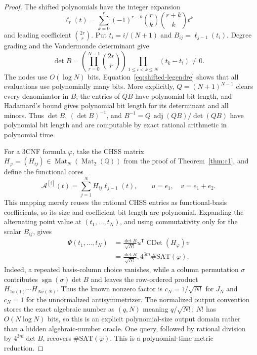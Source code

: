 \documentclass[11pt]{article}
\theoremstyle{definition}
\newcommand{\Mat}{\operatorname{Mat}}
\newcommand{\CDet}{\operatorname{CDet}}
\begin{document}
\begin{proof}
The shifted polynomials have the integer expansion
\begin{equation}
 \ell_r(t)=\sum_{k=0}^r(-1)^{r-k}
 \binom rk\binom{r+k}{k}t^k
 \label{eq:shifted-legendre}
\end{equation}
and leading coefficient $\binom{2r}{r}$.  Put $t_i=i/(N+1)$ and
$B_{ij}=\ell_{j-1}(t_i)$.  Degree grading and the Vandermonde determinant give
\begin{equation}
 \det B=\left(\prod_{r=0}^{N-1}\binom{2r}{r}\right)
 \prod_{1\le i<k\le N}(t_k-t_i)\ne0.
 \label{eq:legendre-determinant}
\end{equation}
The nodes use $O(\log N)$ bits.  Equation~\eqref{eq:shifted-legendre} shows
that all evaluations use polynomially many bits.  More explicitly,
$Q=(N+1)^{N-1}$ clears every denominator in $B$; the entries of $QB$ have
polynomial bit length, and Hadamard's bound gives polynomial bit length for
its determinant and all minors.  Thus $\det B$, $(\det B)^{-1}$, and
$B^{-1}=Q\,\operatorname{adj}(QB)/\det(QB)$ have polynomial bit length and
are computable by exact rational arithmetic in polynomial time.

For a 3CNF formula $\varphi$, take the CHSS matrix
$H_\varphi=(H_{ij})\in\Mat_N(\Mat_2(\mathbb Q))$ from the proof of
Theorem~\ref{thm:c1}, and define the functional cores
\begin{equation}
 \mathcal A^{[i]}(t)=\sum_{j=1}^N H_{ij}\ell_{j-1}(t),
 \qquad u=e_1,\quad v=e_1+e_2.
 \label{eq:legendre-cores}
\end{equation}
This mapping merely reuses the rational CHSS entries as functional-basis
coefficients, so its size and coefficient bit length are polynomial.  Expanding
the alternating point value at $(t_1,\ldots,t_N)$, and using commutativity only
for the scalar $B_{ij}$, gives
\begin{align}
 \Psi(t_1,\ldots,t_N)
 &=\frac{\det B}{\sqrt{N!}}
 u^{\mathsf T}\CDet(H_\varphi)v \\
 &=\frac{\det B}{\sqrt{N!}},4^{3m}\#\mathrm{SAT}(\varphi).
 \label{eq:legendre-point-value}
\end{align}
Indeed, a repeated basis-column choice vanishes, while a column permutation
$\sigma$ contributes $\operatorname{sgn}(\sigma)\det B$ and leaves the
row-ordered product $H_{1\sigma(1)}\cdots H_{N\sigma(N)}$.  Thus the known
nonzero factor is $c_N=1/\sqrt{N!}$ for $J_N$ and $c_N=1$ for the unnormalized
antisymmetrizer.  The normalized output convention stores the exact algebraic
number as $(q,N)$ meaning $q/\sqrt{N!}$; $N!$ has $O(N\log N)$ bits, so this is
an explicit polynomial-size output domain rather than a hidden algebraic-number
oracle.  One query, followed by rational division by $4^{3m}\det B$, recovers
$\#\mathrm{SAT}(\varphi)$.  This is a polynomial-time metric reduction.
\end{proof}
\end{document}

